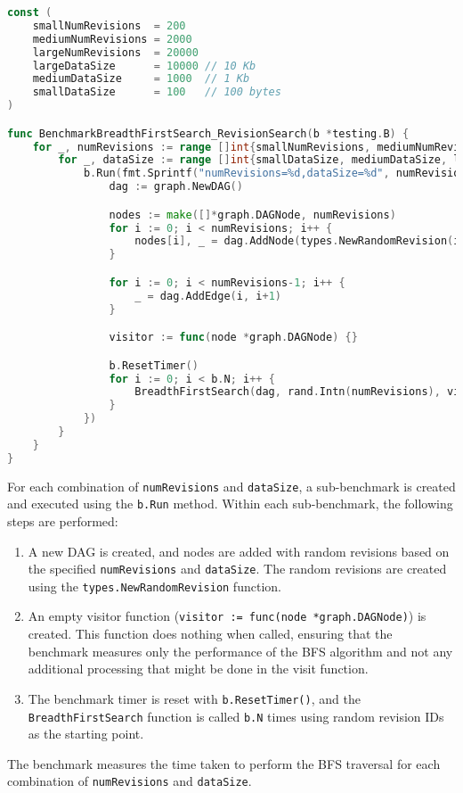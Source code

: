 \begin{lstlisting}[language=go]
const (
	smallNumRevisions  = 200
	mediumNumRevisions = 2000
	largeNumRevisions  = 20000
	largeDataSize      = 10000 // 10 Kb
	mediumDataSize     = 1000  // 1 Kb
	smallDataSize      = 100   // 100 bytes
)

func BenchmarkBreadthFirstSearch_RevisionSearch(b *testing.B) {
	for _, numRevisions := range []int{smallNumRevisions, mediumNumRevisions, largeNumRevisions} {
		for _, dataSize := range []int{smallDataSize, mediumDataSize, largeDataSize} {
			b.Run(fmt.Sprintf("numRevisions=%d,dataSize=%d", numRevisions, dataSize), func(b *testing.B) {
				dag := graph.NewDAG()

				nodes := make([]*graph.DAGNode, numRevisions)
				for i := 0; i < numRevisions; i++ {
					nodes[i], _ = dag.AddNode(types.NewRandomRevision(i, dataSize))
				}

				for i := 0; i < numRevisions-1; i++ {
					_ = dag.AddEdge(i, i+1)
				}

				visitor := func(node *graph.DAGNode) {}

				b.ResetTimer()
				for i := 0; i < b.N; i++ {
					BreadthFirstSearch(dag, rand.Intn(numRevisions), visitor)
				}
			})
		}
	}
}
\end{lstlisting}
\medskip

For each combination of \lstinline{numRevisions} and \lstinline{dataSize}, a sub-benchmark is created and executed using the \lstinline{b.Run} method. Within each sub-benchmark, the following steps are performed:
\begin{enumerate}
	\item A new DAG is created, and nodes are added with random revisions based on the specified \lstinline{numRevisions} and \lstinline{dataSize}. The random revisions are created using the \lstinline{types.NewRandomRevision} function.
	\item An empty visitor function (\lstinline{visitor := func(node *graph.DAGNode)}) is created. This function does nothing when called, ensuring that the benchmark measures only the performance of the BFS algorithm and not any additional processing that might be done in the visit function.
	\item The benchmark timer is reset with \lstinline{b.ResetTimer()}, and the \lstinline{BreadthFirstSearch} function is called \lstinline{b.N} times using random revision IDs as the starting point.
\end{enumerate}
The benchmark measures the time taken to perform the BFS traversal for each combination of \lstinline{numRevisions} and \lstinline{dataSize}.

